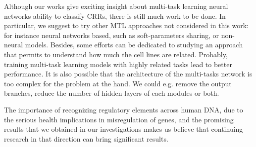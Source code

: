 Although our works give exciting insight about multi-task learning neural networks ability to classify CRRs, there is still much work to be done. In particular, we suggest to try other MTL approaches not considered in this work: for instance neural networks based, such as soft-parameters sharing, or non-neural models. Besides, some efforts can be dedicated to studying an approach that permits to understand how much the cell lines are related. Probably, training multi-task learning models with highly related tasks lead to better performance. It is also possible that the architecture of the multi-tasks network is too complex for the problem at the hand. We could e.g. remove the output branches, reduce the number of hidden layers of each modules or both. 

The importance of recognizing regulatory elements across human DNA, due to the serious health implications in misregulation of genes, and the promising results that we obtained in our investigations makes us believe that continuing research in that direction can bring significant results. 
